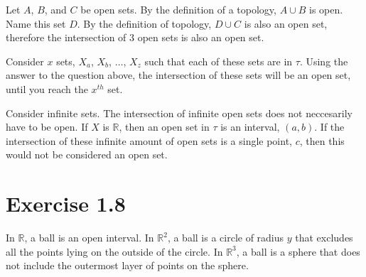 \documentclass{report}
\begin{document}
\sol Let $A$, $B$, and $C$ be open sets. By the definition of a topology, $A \cup B$ is open. Name this set $D$. By the definition of topology, $D \cup C$ is also an open set, therefore the intersection of $3$ open sets is also an open set. 

\sol Consider $x$ sets, $X_a$, $X_b$, $\dots$, $X_z$ such that each of these sets are in $\tau$. Using the answer to the question above, the intersection of these sets will be an open set, until you reach the $x^{th}$ set. 

\sol Consider infinite sets. The intersection of infinite open sets does not neccesarily have to be open. If $X$ is $\mathbb{R}$, then an open set in $\tau$ is an interval, $(a, b)$. If the intersection of these infinite amount of open sets is a single point, ${c}$, then this would not be considered an open set. 

\section{Exercise 1.8}
\sol In $\mathbb{R}$, a ball is an open interval. In $\mathbb{R}^2$, a ball is a circle of radius $y$ that excludes all the points lying on the outside of the circle. In $\mathbb{R}^3$, a ball is a sphere that does not include the outermost layer of points on the sphere. 
\end{document}
